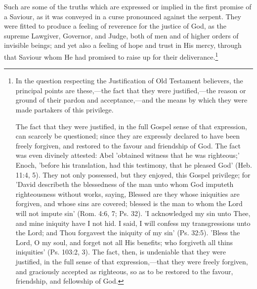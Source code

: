 \documentclass[
]{book}
\begin{document}
Such are some of the truths which are expressed or implied in the first promise of a Saviour, as it was conveyed in a curse pronounced against the serpent. They were fitted to produce a feeling of reverence for the justice of God, as the supreme Lawgiver, Governor, and Judge, both of men and of higher orders of invisible beings; and yet also a feeling of hope and trust in His mercy, through that Saviour whom He had promised to raise up for their deliverance.\footnote{In the question respecting the Justification of Old Testament believers, the principal points are these,---the fact that they were justified,---the reason or ground of their pardon and acceptance,---and the means by which they were made partakers of this privilege.

  The fact that they were justified, in the full Gospel sense of that expression, can scarcely be questioned; since they are expressly declared to have been freely forgiven, and restored to the favour and friendship of God. The fact was even divinely attested: Abel 'obtained witness that he was righteous;' Enoch, 'before his translation, had this testimony, that he pleased God' (Heb. 11:4, 5). They not only possessed, but they enjoyed, this Gospel privilege; for 'David describeth the blessedness of the man unto whom God imputeth righteousness without works, saying, Blessed are they whose iniquities are forgiven, and whose sins are covered; blessed is the man to whom the Lord will not impute sin' (Rom. 4:6, 7; Ps. 32). 'I acknowledged my sin unto Thee, and mine iniquity have I not hid. I said, I will confess my transgressions unto the Lord; and Thou forgavest the iniquity of my sin' (Ps. 32:5). 'Bless the Lord, O my soul, and forget not all His benefits; who forgiveth all thins iniquities' (Ps. 103:2, 3). The fact, then, is undeniable that they were justified, in the full sense of that expression,---that they were freely forgiven, and graciously accepted as righteous, so as to be restored to the favour, friendship, and fellowship of God.

}
\end{document}
